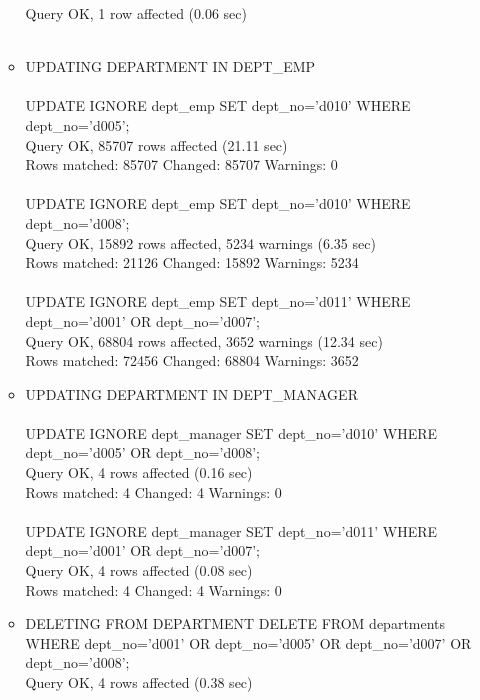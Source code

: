 \documentclass[]{article}
\begin{document}
\begin{enumerate}
\begin{itemize}
Query OK, 1 row affected (0.06 sec)
\\\\
\item UPDATING DEPARTMENT IN DEPT\_EMP
\\\\
UPDATE IGNORE dept\_emp SET dept\_no='d010' WHERE dept\_no='d005';
\\
Query OK, 85707 rows affected (21.11 sec)
\\
Rows matched: 85707  Changed: 85707  Warnings: 0
\\\\
UPDATE IGNORE dept\_emp SET dept\_no='d010' WHERE dept\_no='d008';
\\
Query OK, 15892 rows affected, 5234 warnings (6.35 sec)
\\
Rows matched: 21126  Changed: 15892  Warnings: 5234
\\\\
UPDATE IGNORE dept\_emp SET dept\_no='d011' WHERE dept\_no='d001' OR dept\_no='d007';
\\
Query OK, 68804 rows affected, 3652 warnings (12.34 sec)
\\
Rows matched: 72456  Changed: 68804  Warnings: 3652
\\
\item UPDATING DEPARTMENT IN DEPT\_MANAGER
\\\\
UPDATE IGNORE dept\_manager SET dept\_no='d010' WHERE dept\_no='d005' OR dept\_no='d008';
\\
Query OK, 4 rows affected (0.16 sec)
\\
Rows matched: 4  Changed: 4  Warnings: 0
\\\\
UPDATE IGNORE dept\_manager SET dept\_no='d011' WHERE dept\_no='d001' OR dept\_no='d007';
\\
Query OK, 4 rows affected (0.08 sec)
\\
Rows matched: 4  Changed: 4  Warnings: 0
\\	
\item DELETING FROM DEPARTMENT
DELETE FROM departments WHERE dept\_no='d001' OR dept\_no='d005' OR dept\_no='d007' OR dept\_no='d008';
\\
Query OK, 4 rows affected (0.38 sec)
\end{itemize}
\end{enumerate}
\end{document}
